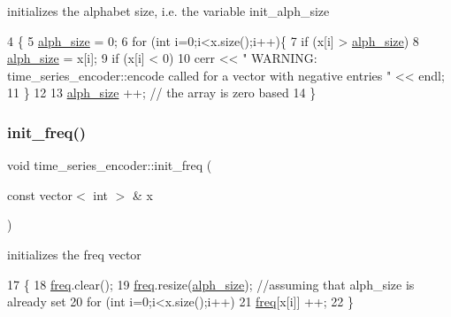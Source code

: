 initializes the alphabet size, i.\+e. the variable init\+\_\+alph\+\_\+size 


\begin{DoxyCode}
4 \{
5   \hyperlink{classtime__series__encoder_a7e73867e25ea5ae643bf05eaf33ea9ac}{alph\_size} = 0;
6   \textcolor{keywordflow}{for} (\textcolor{keywordtype}{int} i=0;i<x.size();i++)\{
7     \textcolor{keywordflow}{if} (x[i] > \hyperlink{classtime__series__encoder_a7e73867e25ea5ae643bf05eaf33ea9ac}{alph\_size})
8       \hyperlink{classtime__series__encoder_a7e73867e25ea5ae643bf05eaf33ea9ac}{alph\_size} = x[i];
9     \textcolor{keywordflow}{if} (x[i] < 0)
10       cerr << \textcolor{stringliteral}{" WARNING: time\_series\_encoder::encode called for a vector with negative entries "} << endl;
11   \}
12 
13   \hyperlink{classtime__series__encoder_a7e73867e25ea5ae643bf05eaf33ea9ac}{alph\_size} ++; \textcolor{comment}{// the array is zero based }
14 \}
\end{DoxyCode}
\mbox{\label{classtime__series__encoder_af4b8988acb10fe076be59302e47084be}} 
\subsubsection{\texorpdfstring{init\+\_\+freq()}{init\_freq()}}
{\footnotesize\ttfamily void time\+\_\+series\+\_\+encoder\+::init\+\_\+freq (\begin{DoxyParamCaption}\item[{const vector$<$ int $>$ \&}]{x }\end{DoxyParamCaption})\hspace{0.3cm}{\ttfamily [private]}}



initializes the freq vector 


\begin{DoxyCode}
17 \{
18   \hyperlink{classtime__series__encoder_ac6496aa39f28da4d8fe964c495e76057}{freq}.clear();
19   \hyperlink{classtime__series__encoder_ac6496aa39f28da4d8fe964c495e76057}{freq}.resize(\hyperlink{classtime__series__encoder_a7e73867e25ea5ae643bf05eaf33ea9ac}{alph\_size}); \textcolor{comment}{//assuming that alph\_size is already set}
20   \textcolor{keywordflow}{for} (\textcolor{keywordtype}{int} i=0;i<x.size();i++)
21     \hyperlink{classtime__series__encoder_ac6496aa39f28da4d8fe964c495e76057}{freq}[x[i]] ++;
22 \}
\end{DoxyCode}
\mbox{\label{classtime__series__encoder_a90eb54134d6af2ab2cca36ee13956470}} 
